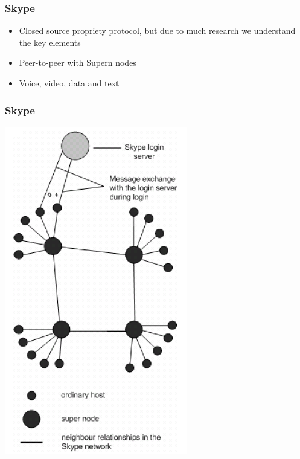\begin{frame}
\frametitle{Skype}

\begin{itemize}		
		\item Closed source propriety protocol, but due to much research we understand the key elements 
		\item Peer-to-peer with Supern nodes
		\item Voice, video, data and text
	\end{itemize}


\end{frame}


\begin{frame}
\frametitle{Skype}

\begin{center} 
  		\includegraphics[height=0.9\textheight]{Skype_network2.png} 
	\end{center} 
\end{frame}
